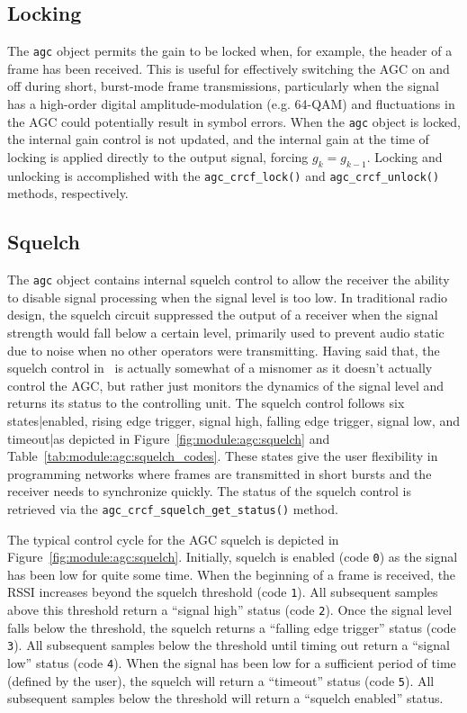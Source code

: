 \subsection{Locking}
\label{module:agc:locking}
The {\tt agc} object permits the gain to be locked when, for example,
the header of a frame has been received.
This is useful for effectively switching the AGC on and off during short,
burst-mode frame transmissions, particularly when the signal has a high-order
digital amplitude-modulation (e.g. 64-QAM) and fluctuations in the AGC
could potentially result in symbol errors.
%
When the {\tt agc} object is locked, the internal gain control is not
updated,
and the internal gain at the time of locking is applied directly to the
output signal, forcing $g_k = g_{k-1}$.
%
Locking and unlocking is accomplished with the
{\tt agc\_crcf\_lock()} and
{\tt agc\_crcf\_unlock()} methods, respectively.

\subsection{Squelch}
\label{module:agc:squelch}
The {\tt agc} object contains internal squelch control to allow the
receiver the ability to disable signal processing when the signal
level is too low.
In traditional radio design, the squelch circuit suppressed the output
of a receiver when the signal strength would fall below a certain level,
primarily used to prevent audio static due to noise when no other
operators were transmitting.
Having said that, the squelch control in \liquid\ is actually somewhat
of a misnomer as it doesn't actually control the AGC, but rather just
monitors the dynamics of the signal level and returns its status to the
controlling unit.
The squelch control follows six states|enabled, rising edge trigger,
signal high, falling edge trigger, signal low, and timeout|as depicted
in Figure~\ref{fig:module:agc:squelch} and
Table~\ref{tab:module:agc:squelch_codes}.
These states give the user flexibility in programming networks where
frames are transmitted in short bursts and the receiver needs to
synchronize quickly.
The status of the squelch control is retrieved via the
{\tt agc\_crcf\_squelch\_get\_status()} method.

The typical control cycle for the AGC squelch is depicted in
Figure~\ref{fig:module:agc:squelch}.
Initially, squelch is enabled (code {\tt 0}) as the signal has been low for
quite some time.
When the beginning of a frame is received, the RSSI increases beyond the
squelch threshold (code {\tt 1}).
All subsequent samples above this threshold return a ``signal high'' status
(code {\tt 2}).
Once the signal level falls below the threshold, the squelch returns a
``falling edge trigger'' status (code {\tt 3}).
All subsequent samples below the threshold until timing out return a ``signal
low'' status (code {\tt 4}).
When the signal has been low for a sufficient period of time (defined by the
user), the squelch will return a ``timeout'' status (code {\tt 5}).
All subsequent samples below the threshold will return a ``squelch enabled''
status.

